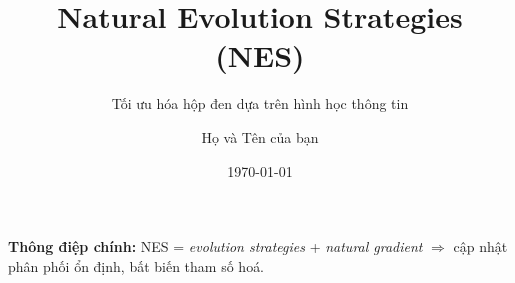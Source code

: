 \documentclass[10pt,xcolor=dvipsnames]{beamer}
\title[Natural Evolution Strategies]{Natural Evolution Strategies (NES)}
\subtitle{Tối ưu hóa hộp đen dựa trên hình học thông tin}
\author[Họ Tên]{Họ và Tên của bạn}
\institute[Đại học XYZ]{Khoa Công nghệ thông tin \\ Trường Đại học ...}
\date{\today}
\begin{document}
	
	\begin{frame} 
		\titlepage
		\vspace{0.5cm}
		\centering
		\textbf{Thông điệp chính:} NES = \emph{evolution strategies} + \emph{natural gradient} $\Rightarrow$ cập nhật phân phối ổn định, bất biến tham số hoá.
	\end{frame}
\end{document}
